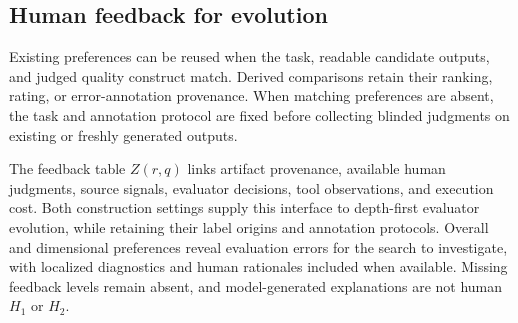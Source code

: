 \subsection{Human feedback for evolution}

Existing preferences can be reused when the task, readable candidate outputs, and judged quality construct match.
Derived comparisons retain their ranking, rating, or error-annotation provenance.
When matching preferences are absent, the task and annotation protocol are fixed before collecting blinded judgments on existing or freshly generated outputs.

The feedback table $Z(r,q)$ links artifact provenance, available human judgments, source signals, evaluator decisions, tool observations, and execution cost.
Both construction settings supply this interface to depth-first evaluator evolution, while retaining their label origins and annotation protocols.
Overall and dimensional preferences reveal evaluation errors for the search to investigate, with localized diagnostics and human rationales included when available.
Missing feedback levels remain absent, and model-generated explanations are not human $H_1$ or $H_2$.
